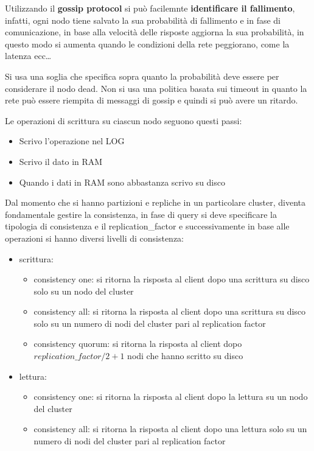       Utilizzando il \textbf{gossip protocol} si può facilemnte \textbf{identificare
            il fallimento}, infatti, ogni nodo tiene salvato la sua probabilità di
      fallimento e in fase di comunicazione, in base alla velocità delle risposte
      aggiorna la sua probabilità, in questo modo si aumenta quando le condizioni
      della rete peggiorano, come la latenza ecc\dots

      Si usa una soglia che specifica sopra quanto la probabilità deve essere per considerare
      il nodo dead. Non si usa una politica basata sui timeout in quanto la rete può
      essere riempita di messaggi di gossip e quindi si può avere un ritardo.

      Le operazioni di scrittura su ciascun nodo seguono questi passi:
      \begin{itemize}
            \item Scrivo l'operazione nel LOG
            \item Scrivo il dato in RAM
            \item Quando i dati in RAM sono abbastanza scrivo su disco
      \end{itemize}

      Dal momento che si hanno partizioni e repliche in un particolare cluster, diventa
      fondamentale gestire la consistenza, in fase di query si deve specificare
      la tipologia di consistenza e il replication\_factor e successivamente in base
      alle operazioni si hanno diversi livelli di consistenza:
      \begin{itemize}
            \item scrittura:
                  \begin{itemize}
                        \item consistency one: si ritorna la risposta al client dopo una scrittura
                              su disco solo su un nodo del cluster
                        \item consistency all: si ritorna la risposta al client dopo una scrittura
                              su disco solo su un numero di nodi del cluster pari al replication factor
                        \item consistency quorum: si ritorna la risposta al client dopo $replication\_factor/2+1$ nodi che
                              hanno scritto su disco
                  \end{itemize}
            \item lettura:
                  \begin{itemize}
                        \item consistency one: si ritorna la risposta al client dopo la lettura
                              su un nodo del cluster
                        \item consistency all: si ritorna la risposta al client dopo una lettura
                              solo su un numero di nodi del cluster pari al replication factor
                  \end{itemize}
      \end{itemize}

